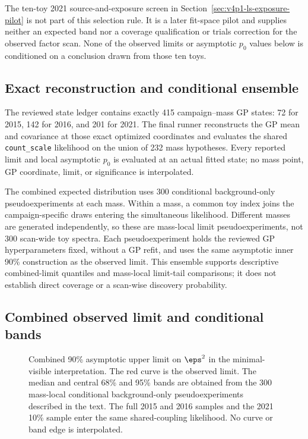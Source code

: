 The ten-toy 2021 source-and-exposure screen in
Section~\ref{sec:v4p1-ls-exposure-pilot} is not part of this selection rule. It is
a later fit-space pilot and supplies neither an expected band nor a coverage
qualification or trials correction for the observed factor scan. None of the
observed limits or asymptotic $p_0$ values below is conditioned on a conclusion
drawn from those ten toys.

\subsection{Exact reconstruction and conditional ensemble}
\label{sec:results-v4p2-reconstruction}

The reviewed state ledger contains exactly 415 campaign--mass GP states: 72 for
2015, 142 for 2016, and 201 for 2021. The final runner reconstructs the GP mean
and covariance at those exact optimized coordinates and evaluates the shared
\texttt{count\_scale} likelihood on the union of 232 mass hypotheses. Every
reported limit and local asymptotic $p_0$ is evaluated at an actual fitted state;
no mass point, GP coordinate, limit, or significance is interpolated.

The combined expected distribution uses 300 conditional background-only
pseudoexperiments at each mass. Within a mass, a common toy index joins the
campaign-specific draws entering the simultaneous likelihood. Different masses
are generated independently, so these are mass-local limit pseudoexperiments,
not 300 scan-wide toy spectra. Each pseudoexperiment holds the reviewed GP
hyperparameters fixed, without a GP refit, and uses the same asymptotic inner
90\% \CLs{} construction as the observed limit. This ensemble supports
descriptive combined-limit quantiles and mass-local limit-tail comparisons; it
does not establish direct \CLs{} coverage or a scan-wise discovery probability.

\subsection{Combined observed limit and conditional bands}
\label{sec:results-v4p2-combined-limit}
\label{sec:results-v4-combined-limit}

\begin{figure}[H]
\centering
{}
\caption{Combined 90\% asymptotic \CLs{} upper limit on $\eps^2$ in the
minimal-visible interpretation. The red curve is the observed limit. The median
and central 68\% and 95\% bands are obtained from the 300 mass-local
conditional background-only pseudoexperiments described in the text. The full
2015 and 2016
samples and the 2021 10\% sample enter the same shared-coupling likelihood. No
curve or band edge is interpolated.}
\label{fig:results-v4p2-combined-band}
\end{figure}

